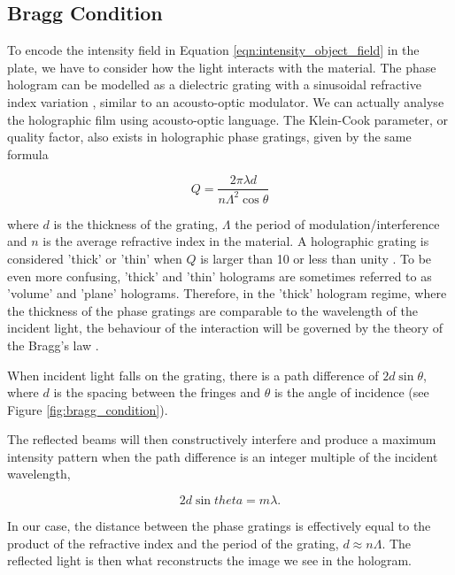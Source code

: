 \documentclass[aps,prl,reprint,10pt,amsmath,amssymb,superscriptaddress,a4paper]{revtex4-2}
\begin{document}
\subsection{Bragg Condition}

To encode the intensity field in Equation \ref{eqn:intensity_object_field} in the plate, we have to consider how the light interacts with the material. The phase hologram can be 
modelled as a dielectric grating with a sinusoidal refractive index variation \citep{kogelnik2}, similar to an acousto-optic modulator. We can actually analyse the holographic 
film using acousto-optic language. The Klein-Cook parameter, or quality factor, also exists in holographic phase gratings, given by the same formula 

\begin{equation}
    Q = \frac{2\pi \lambda d}{n \Lambda^2 \cos{\theta}}
\end{equation}

where $d$ is the thickness of the grating, $\Lambda$ the period of modulation/interference and $n$ is the average refractive index in the material. A holographic grating is considered 'thick' or 'thin' 
when $Q$ is larger than 10 or less than unity \citep{hariharan}. To be even more confusing, 'thick' and 'thin' holograms are sometimes referred to as 'volume' and 'plane' holograms. 
Therefore, in the 'thick' hologram regime, where the thickness of the phase gratings are comparable to the wavelength of the incident light, the behaviour of the interaction will be governed by the 
theory of the Bragg's law \citep{bragg}.

When incident light falls on the grating, there is a path difference of $2d\sin{\theta}$, where $d$ is the spacing between the fringes and $\theta$ is the angle of incidence (see Figure \ref{fig:bragg_condition}).

The reflected beams will then constructively interfere and produce a maximum intensity pattern when the path difference is an integer multiple of the incident wavelength,

\begin{equation}
    2d\sin{theta} = m\lambda.
\end{equation}

In our case, the distance between the phase gratings is effectively equal to the product of the refractive index and the period of the grating, $d \approx n\Lambda$. 
The reflected light is then what reconstructs the image we see in the hologram.
\end{document}
